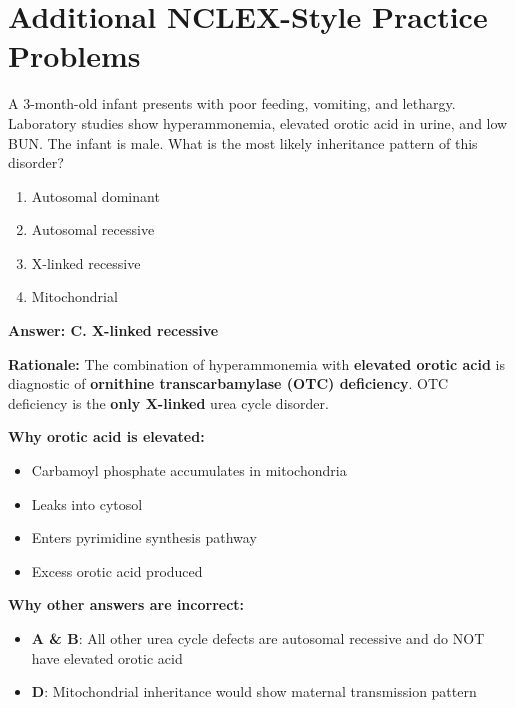 
\section{Additional NCLEX-Style Practice Problems}

\begin{exercise}
A 3-month-old infant presents with poor feeding, vomiting, and lethargy. Laboratory studies show hyperammonemia, elevated orotic acid in urine, and low BUN. The infant is male. What is the most likely inheritance pattern of this disorder?
\begin{enumerate}[label=\Alph*.]
    \item Autosomal dominant
    \item Autosomal recessive
    \item X-linked recessive
    \item Mitochondrial
\end{enumerate}
\end{exercise}

\begin{solution}
\textbf{Answer: C. X-linked recessive}

\textbf{Rationale:} The combination of hyperammonemia with \textbf{elevated orotic acid} is diagnostic of \textbf{ornithine transcarbamylase (OTC) deficiency}. OTC deficiency is the \textbf{only X-linked} urea cycle disorder.

\textbf{Why orotic acid is elevated:}
\begin{itemize}
    \item Carbamoyl phosphate accumulates in mitochondria
    \item Leaks into cytosol
    \item Enters pyrimidine synthesis pathway
    \item Excess orotic acid produced
\end{itemize}

\textbf{Why other answers are incorrect:}
\begin{itemize}
    \item \textbf{A \& B}: All other urea cycle defects are autosomal recessive and do NOT have elevated orotic acid
    \item \textbf{D}: Mitochondrial inheritance would show maternal transmission pattern
\end{itemize}
\end{solution}

